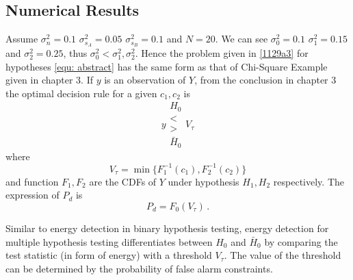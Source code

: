 \subsection{Numerical Results}
Assume $\sigma_n^2=0.1$ $\sigma_{s_A}^2=0.05$ $\sigma_{s_B}^2=0.1$ and $N=20$. We can see $\sigma_0^2=0.1$ $\sigma_1^2=0.15$ and $\sigma_2^2=0.25$, 
thus $\sigma_0^2 < \sigma_1^2, \sigma_2^2$. Hence the problem given in \eqref{1129a3} for hypotheses \eqref{equ: abstract} has the same form as that of Chi-Square Example given in chapter 3. 
If $y$ is an observation of $Y$, 
from the conclusion in chapter 3 the optimal  decision rule for a given $c_1, c_2$ is 
\begin{equation}
  y \substack{H_0 \\ < \\ > \\ \bar{H}_0} V_\tau
  \label{equ:1129a4}
\end{equation}
where 
\begin{equation}
  V_\tau = \min\{F_1^{-1}(c_1),  F_2^{-1}(c_2)\}
  \label{equ:2015may1a2}
\end{equation}
and function $F_1,  F_2$ are the CDFs of $Y$ under hypothesis $H_1, H_2$ respectively. The expression of $P_d$ is 
\begin{equation}
  P_d = F_0(V_\tau)\,.
  \label{equ:1129a5}
\end{equation}

Similar to energy detection in binary hypothesis testing, energy detection for multiple hypothesis testing differentiates between $H_0$ and $\bar{H}_0$ by comparing the test statistic (in form of energy) with a threshold $V_\tau$. The value of the threshold can be determined by the probability of false alarm constraints.   

